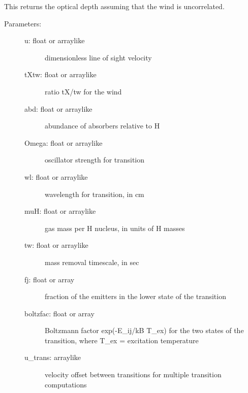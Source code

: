 \documentclass[letterpaper,10pt,english]{sphinxmanual}
\begin{document}
\begin{fulllineitems}
\begin{fulllineitems}
\begin{description}
\end{description}

\end{fulllineitems}


\begin{fulllineitems}
\label{fulldoc:despotic.winds.pwind.tau_uc}
This returns the optical depth assuming that the wind is
uncorrelated.
\begin{description}
\item[{Parameters:}] \leavevmode\begin{description}
\item[{u: float or arraylike}] \leavevmode
dimensionless line of sight velocity

\item[{tXtw: float or arraylike}] \leavevmode
ratio tX/tw for the wind

\item[{abd: float or arraylike}] \leavevmode
abundance of absorbers relative to H

\item[{Omega: float or arraylike}] \leavevmode
oscillator strength for transition

\item[{wl: float or arraylike}] \leavevmode
wavelength for transition, in cm

\item[{muH: float or arraylike}] \leavevmode
gas mass per H nucleus, in units of H masses

\item[{tw: float or arraylike}] \leavevmode
mass removal timescale, in sec

\item[{fj: float or array}] \leavevmode
fraction of the emitters in the lower state of the
transition

\item[{boltzfac: float or array}] \leavevmode
Boltzmann factor exp(-E\_ij/kB T\_ex) for the two states of
the transition, where T\_ex = excitation temperature

\item[{u\_trans: arraylike}] \leavevmode
velocity offset between transitions for multiple
transition computations


\end{description}
\end{description}
\end{fulllineitems}
\end{fulllineitems}
\end{document}
